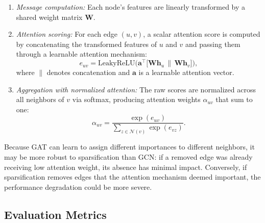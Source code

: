 \documentclass[conference]{IEEEtran}
\begin{document}
\begin{enumerate}
    \item \emph{Message computation:} Each node's features are linearly transformed by a shared weight matrix $\mathbf{W}$.
    \item \emph{Attention scoring:} For each edge $(u, v)$, a scalar attention score is computed by concatenating the transformed features of $u$ and $v$ and passing them through a learnable attention mechanism:
    \begin{equation}
        e_{uv} = \text{LeakyReLU}\!\Big(\mathbf{a}^\top \big[\mathbf{W}\mathbf{h}_u \,\big\|\, \mathbf{W}\mathbf{h}_v\big]\Big),
        \label{eq:gat_score}
    \end{equation}
    where $\|$ denotes concatenation and $\mathbf{a}$ is a learnable attention vector.
    \item \emph{Aggregation with normalized attention:} The raw scores are normalized across all neighbors of $v$ via softmax, producing attention weights $\alpha_{uv}$ that sum to one:
    \begin{equation}
        \alpha_{uv} = \frac{\exp(e_{uv})}{\sum_{z \in \mathcal{N}(v)} \exp(e_{vz})}.
        \label{eq:gat_attention}
    \end{equation}
\end{enumerate}

Because GAT can learn to assign different importances to different neighbors, it may be more robust to sparsification than GCN: if a removed edge was already receiving low attention weight, its absence has minimal impact. Conversely, if sparsification removes edges that the attention mechanism deemed important, the performance degradation could be more severe.

\subsection{Evaluation Metrics}
\end{document}
